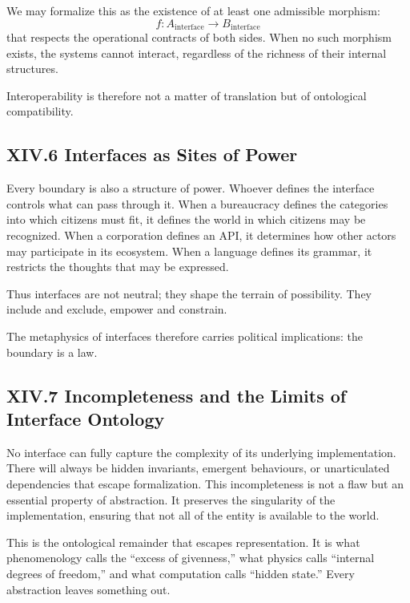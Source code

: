 \documentclass[11pt,letterpaper]{article}
\begin{document}
We may formalize this as the existence of at least one admissible morphism:
\[
f: A_{\text{interface}} \to B_{\text{interface}}
\]
that respects the operational contracts of both sides. When no such morphism exists, the systems cannot interact, regardless of the richness of their internal structures.

Interoperability is therefore not a matter of translation but of ontological compatibility.

\subsection{XIV.6 Interfaces as Sites of Power}

Every boundary is also a structure of power. Whoever defines the interface controls what can pass through it. When a bureaucracy defines the categories into which citizens must fit, it defines the world in which citizens may be recognized. When a corporation defines an API, it determines how other actors may participate in its ecosystem. When a language defines its grammar, it restricts the thoughts that may be expressed.

Thus interfaces are not neutral; they shape the terrain of possibility. They include and exclude, empower and constrain.

The metaphysics of interfaces therefore carries political implications: the boundary is a law.

\subsection{XIV.7 Incompleteness and the Limits of Interface Ontology}

No interface can fully capture the complexity of its underlying implementation. There will always be hidden invariants, emergent behaviours, or unarticulated dependencies that escape formalization. This incompleteness is not a flaw but an essential property of abstraction. It preserves the singularity of the implementation, ensuring that not all of the entity is available to the world.

This is the ontological remainder that escapes representation. It is what phenomenology calls the ``excess of givenness,'' what physics calls ``internal degrees of freedom,'' and what computation calls ``hidden state.'' Every abstraction leaves something out.
\end{document}
